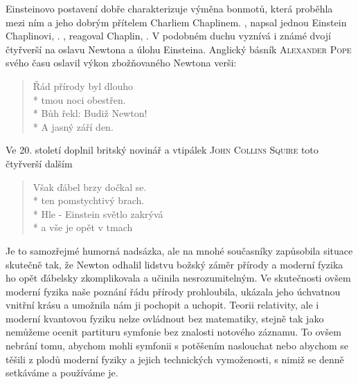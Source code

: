         Einsteinovo postavení dobře charakterizuje výměna bonmotů, která proběhla mezi ním a jeho
        dobrým přítelem Charliem Chaplinem. \emph{}, napsal jednou Einstein
        Chaplinovi, \emph{}. \emph{}, reagoval Chaplin, \emph{}. V
        podobném duchu vyznívá i známé dvojí čtyřverší na oslavu Newtona a úlohu Einsteina. Anglický
        básník \textsc{Alexander Pope} svého času oslavil výkon zbožňovaného Newtona verši:

        \begin{verse}
          Řád přírody byl dlouho  \\*
          tmou noci obestřen.     \\*
          Bůh řekl: Budiž Newton! \\*
          A jasný září den.
        \end{verse}

        Ve 20. století doplnil britský novinář a vtipálek \textsc{John Collins Squire} toto
        čtyřverší dalším

        \begin{verse}
          Však ďábel brzy dočkal se.    \\*
          ten pomstychtivý brach.       \\*
          Hle - Einstein světlo zakrývá \\*
          a vše je opět v tmach
        \end{verse}

        Je to samozřejmé humorná nadsázka, ale na mnohé současníky zapůsobila situace skutečně tak,
        že Newton odhalil lidstvu božský záměr přírody a moderní fyzika ho opět ďábelsky
        zkomplikovala a učinila nesrozumitelným. Ve skutečnosti ovšem moderní fyzika naše poznání
        řádu přírody prohloubila, ukázala jeho úchvatnou vnitřní krásu a umožnila nám ji pochopit a
        uchopit. Teorii relativity, ale i moderní kvantovou fyziku nelze ovládnout bez matematiky,
        stejně tak jako nemůžeme ocenit partituru symfonie bez znalosti notového záznamu. To ovšem
        nebrání tomu, abychom mohli symfonii s potěšením naslouchat nebo abychom se těšili z plodů
        moderní fyziky a jejich technických vymoženosti, s nimiž se denně setkáváme a používáme je.

